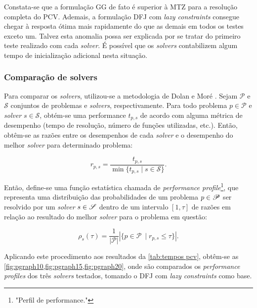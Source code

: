 Constata-se que a formulação GG de fato é superior à MTZ para a resolução completa do PCV. Ademais, a formulação DFJ com \emph{lazy constraints} consegue chegar à resposta ótima mais rapidamente do que as demais em todos os testes exceto um. Talvez esta anomalia possa ser explicada por se tratar do primeiro teste realizado com cada \emph{solver}. É possível que os \emph{solvers} contabilizem algum tempo de inicialização adicional nesta situação.

\subsubsection{Comparação de solvers}
Para comparar os \emph{solvers}, utilizou-se a metodologia de Dolan e Moré \cite{DOLAN:02}. Sejam $\mathcal{P}$ e $\mathcal{S}$ conjuntos de problemas e \emph{solvers}, respectivamente. Para todo problema $p \in \mathcal{P}$ e \emph{solver} $s \in \mathcal{S}$, obtém-se uma performance $t_{p,s}$ de acordo com alguma métrica de desempenho (tempo de resolução, número de funções utilizadas, etc.). Então, obtêm-se as razões entre os desempenhos de cada \emph{solver} e o desempenho do melhor \emph{solver} para determinado problema:

\begin{equation}
    r_{p,s} = \frac{t_{p,s}}{\min\{t_{p,s} \mid s \in \mathcal{S}\}}.
\end{equation}

Então, define-se uma função estatística chamada de \emph{performance profile}\footnote{"Perfil de performance."}, que representa uma distribuição das probabilidades de um problema $p \in \mathcal{P}$ ser resolvido por um \emph{solver} $s \in \mathcal{S}$ dentro de um intervalo $[1,\tau]$ de razões em relação ao resultado do melhor \emph{solver} para o problema em questão:

\begin{equation}
    \rho_s(\tau) = \frac{1}{|\mathcal{P}|}|\{p \in \mathcal{P}\ \mid r_{p,s} \leq \tau\}|.
\end{equation}

Aplicando este procedimento aos resultados da \cref{tab:tempos pcv}, obtêm-se as \cref{fig:pgraph10,fig:pgraph15,fig:pgraph20}, onde são comparados os \emph{performance profiles} dos três \emph{solvers} testados, tomando o DFJ com \emph{lazy constraints} como base.

